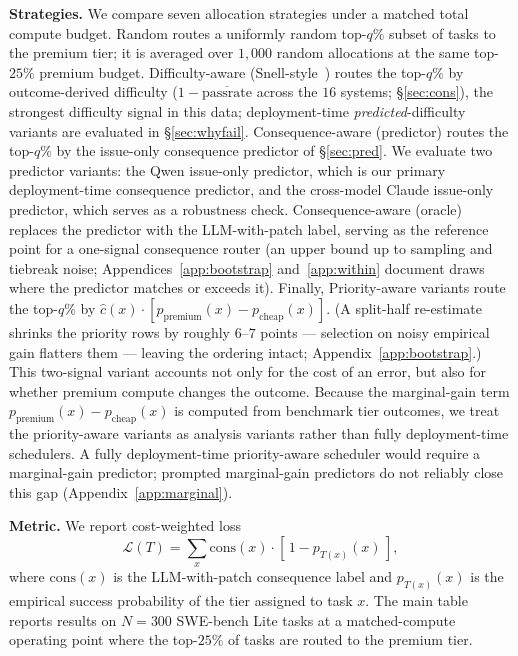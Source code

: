 \documentclass{article}
\begin{document}
\textbf{Strategies.} We compare seven allocation strategies under a
matched total compute budget. Random routes a uniformly random
top-$q\%$ subset of tasks to the premium tier; it is averaged over
$1{,}000$ random allocations at the same top-$25\%$ premium budget.
Difficulty-aware
(Snell-style~\citep{snell2024scaling}) routes the top-$q\%$ by
outcome-derived difficulty ($1-\overline{\mathrm{passrate}}$ across
the $16$ systems; \S\ref{sec:cons}), the strongest difficulty signal
in this data; deployment-time \emph{predicted}-difficulty variants
are evaluated in \S\ref{sec:whyfail}. Consequence-aware
(predictor) routes the top-$q\%$ by the issue-only consequence
predictor of \S\ref{sec:pred}. We evaluate two predictor variants:
the Qwen issue-only predictor, which is our primary deployment-time
consequence predictor, and the cross-model Claude issue-only predictor,
which serves as a robustness check. Consequence-aware (oracle) replaces the
predictor with the LLM-with-patch label, serving as the reference
point for a one-signal consequence router (an upper bound up to
sampling and tiebreak noise; Appendices~\ref{app:bootstrap}
and~\ref{app:within} document draws where the predictor matches or
exceeds it). Finally, Priority-aware variants route the top-$q\%$ by
$\hat{c}(x) \cdot [p_{\mathrm{premium}}(x) -
p_{\mathrm{cheap}}(x)]$. (A split-half re-estimate shrinks the priority rows by roughly
$6$--$7$ points --- selection on noisy empirical gain flatters them
--- leaving the ordering intact; Appendix~\ref{app:bootstrap}.)
This two-signal variant accounts not only
for the cost of an error, but also for whether premium compute changes
the outcome. Because the marginal-gain term
$p_{\mathrm{premium}}(x)-p_{\mathrm{cheap}}(x)$ is computed from
benchmark tier outcomes, we treat the priority-aware variants as
analysis variants rather than fully deployment-time schedulers. A
fully deployment-time priority-aware scheduler would require a
marginal-gain predictor; prompted marginal-gain predictors do not
reliably close this gap (Appendix~\ref{app:marginal}).



\textbf{Metric.} We report cost-weighted loss
\[
\mathcal{L}(T) = \sum_x \mathrm{cons}(x)\cdot
[\,1 - p_{T(x)}(x)\,],
\]
where $\mathrm{cons}(x)$ is the LLM-with-patch consequence label and
$p_{T(x)}(x)$ is the empirical success probability of the tier assigned
to task $x$. The main table reports results on $N=300$ SWE-bench Lite
tasks at a matched-compute operating point where the top-$25\%$ of
tasks are routed to the premium tier.
\end{document}

